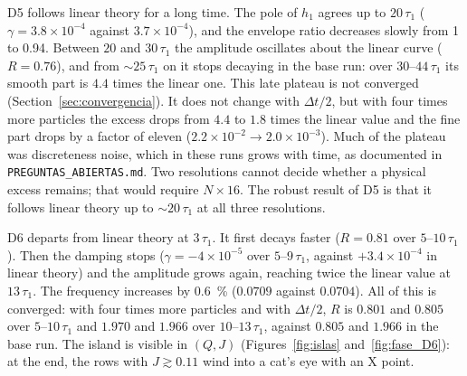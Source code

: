 \documentclass[11pt,a4paper]{article}
\begin{document}
D5 follows linear theory for a long time. The pole of $h_1$ agrees up to $20\,\tau_1$
($\gamma=3.8\times10^{-4}$ against $3.7\times10^{-4}$), and the envelope ratio decreases slowly
from 1 to 0.94. Between $20$ and $30\,\tau_1$ the amplitude oscillates about the linear
curve ($R=0.76$), and from $\sim25\,\tau_1$ on it stops decaying in the base run: over
$30$--$44\,\tau_1$ its smooth part is $4.4$ times the linear one. This late plateau is not
converged (Section~\ref{sec:convergencia}). It does not change with $\Delta t/2$, but with four
times more particles the excess drops from $4.4$ to $1.8$ times the linear value and the
fine part drops by a factor of eleven ($2.2\times10^{-2}\to2.0\times10^{-3}$). Much of the
plateau was discreteness noise, which in these runs grows with time, as documented in
\texttt{PREGUNTAS\_ABIERTAS.md}. Two resolutions cannot decide whether a physical excess
remains; that would require $N\times16$. The robust result of D5 is that it follows
linear theory up to $\sim20\,\tau_1$ at all three resolutions.

D6 departs from linear theory at $3\,\tau_1$. It first decays faster ($R=0.81$ over
$5$--$10\,\tau_1$). Then the damping stops ($\gamma=-4\times10^{-5}$ over $5$--$9\,\tau_1$,
against $+3.4\times10^{-4}$ in linear theory) and the amplitude grows again, reaching twice
the linear value at $13\,\tau_1$. The frequency increases by \SI{0.6}{\%} ($0.0709$ against
$0.0704$). All of this is converged: with four times more particles and with $\Delta t/2$,
$R$ is $0.801$ and $0.805$ over $5$--$10\,\tau_1$ and $1.970$ and $1.966$ over
$10$--$13\,\tau_1$, against $0.805$ and $1.966$ in the base run. The island is visible in
$(Q,J)$ (Figures~\ref{fig:islas} and~\ref{fig:fase_D6}): at the end, the rows with
$J\gtrsim0.11$ wind into a cat's eye with an X point.
\end{document}
